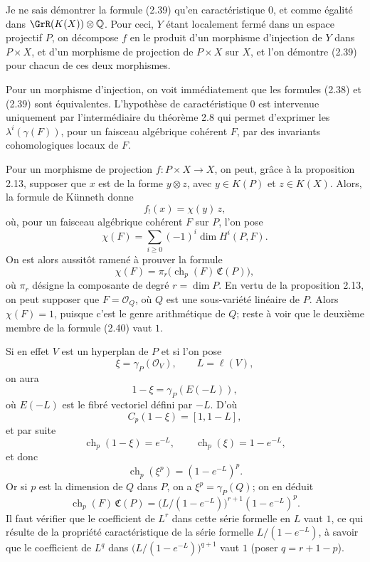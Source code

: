 \documentclass[11pt]{article}
\newcommand{\ch}{\operatorname{ch}}
\providecommand{\ch}{\operatorname{ch}}
\begin{document}
Je ne sais démontrer la formule (2.39) qu'en caractéristique \(0\), et comme égalité dans \(\GrR(K(X))\otimes\mathbb Q\). Pour ceci, \(Y\) étant localement fermé dans un espace projectif \(P\), on décompose \(f\) en le produit d'un morphisme d'injection de \(Y\) dans \(P\times X\), et d'un morphisme de projection de \(P\times X\) sur \(X\), et l'on démontre (2.39) pour chacun de ces deux morphismes.

Pour un morphisme d'injection, on voit immédiatement que les formules (2.38) et (2.39) sont équivalentes. L'hypothèse de caractéristique \(0\) est intervenue uniquement par l'intermédiaire du théorème 2.8 qui permet d'exprimer les \(\lambda^i(\gamma(F))\), pour un faisceau algébrique cohérent \(F\), par des invariants cohomologiques locaux de \(F\).

Pour un morphisme de projection \(f:P\times X\to X\), on peut, grâce à la proposition 2.13, supposer que \(x\) est de la forme \(y\otimes z\), avec \(y\in K(P)\) et \(z\in K(X)\). Alors, la formule de Künneth donne
\[
  f_!(x)=\chi(y)\,z,
\]
où, pour un faisceau algébrique cohérent \(F\) sur \(P\), l'on pose
\[
  \chi(F)=\sum_{i\geq 0}(-1)^i\dim H^i(P,F).
\]
On est alors aussitôt ramené à prouver la formule
\begin{equation}\tag{2.40}
  \chi(F)=\pi_r\bigl(\ch_p(F)\,\mathfrak C(P)\bigr),
\end{equation}
où \(\pi_r\) désigne la composante de degré \(r=\dim P\). En vertu de la proposition 2.13, on peut supposer que \(F=\mathcal O_Q\), où \(Q\) est une sous-variété linéaire de \(P\). Alors \(\chi(F)=1\), puisque c'est le genre arithmétique de \(Q\); reste à voir que le deuxième membre de la formule (2.40) vaut \(1\).

Si en effet \(V\) est un hyperplan de \(P\) et si l'on pose
\[
  \xi=\gamma_P(\mathcal O_V),\qquad L=\ell(V),
\]
on aura
\[
  1-\xi=\gamma_P(E(-L)),
\]
où \(E(-L)\) est le fibré vectoriel défini par \(-L\). D'où
\[
  C_p(1-\xi)=[1,1-L],
\]
et par suite
\[
  \ch_p(1-\xi)=e^{-L},\qquad \ch_p(\xi)=1-e^{-L},
\]
et donc
\[
  \ch_p(\xi^p)=(1-e^{-L})^p.
\]
Or si \(p\) est la dimension de \(Q\) dans \(P\), on a \(\xi^p=\gamma_P(Q)\); on en déduit
\[
  \ch_p(F)\,\mathfrak C(P)
  =
  \bigl(L/(1-e^{-L})\bigr)^{r+1}(1-e^{-L})^p.
\]
Il faut vérifier que le coefficient de \(L^r\) dans cette série formelle en \(L\) vaut \(1\), ce qui résulte de la propriété caractéristique de la série formelle \(L/(1-e^{-L})\), à savoir que le coefficient de \(L^q\) dans \(\bigl(L/(1-e^{-L})\bigr)^{q+1}\) vaut \(1\) (poser \(q=r+1-p\)).
\end{document}
